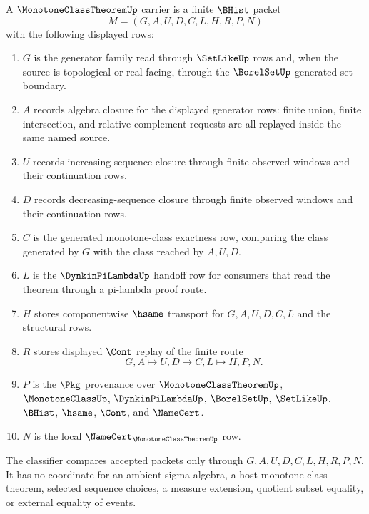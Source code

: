 \begin{definition}
\label{def:monotone-class-theorem-carrier}
A $\MonotoneClassTheoremUp$ carrier is a finite $\BHist$ packet
$$
M=(G,A,U,D,C,L,H,R,P,N)
$$
with the following displayed rows:
\begin{enumerate}
\item $G$ is the generator family read through $\SetLikeUp$ rows and, when the source is topological or real-facing, through the $\BorelSetUp$ generated-set boundary.
\item $A$ records algebra closure for the displayed generator rows: finite union, finite intersection, and relative complement requests are all replayed inside the same named source.
\item $U$ records increasing-sequence closure through finite observed windows and their continuation rows.
\item $D$ records decreasing-sequence closure through finite observed windows and their continuation rows.
\item $C$ is the generated monotone-class exactness row, comparing the class generated by $G$ with the class reached by $A,U,D$.
\item $L$ is the $\DynkinPiLambdaUp$ handoff row for consumers that read the theorem through a pi-lambda proof route.
\item $H$ stores componentwise $\hsame$ transport for $G,A,U,D,C,L$ and the structural rows.
\item $R$ stores displayed $\Cont$ replay of the finite route
$$
G,A \longmapsto U,D \longmapsto C,L \longmapsto H,P,N .
$$
\item $P$ is the $\Pkg$ provenance over $\MonotoneClassTheoremUp$, $\MonotoneClassUp$, $\DynkinPiLambdaUp$, $\BorelSetUp$, $\SetLikeUp$, $\BHist$, $\hsame$, $\Cont$, and $\NameCert$.
\item $N$ is the local $\NameCert_{\MonotoneClassTheoremUp}$ row.
\end{enumerate}
The classifier compares accepted packets only through $G,A,U,D,C,L,H,R,P,N$. It has no coordinate for an ambient sigma-algebra, a host monotone-class theorem, selected sequence choices, a measure extension, quotient subset equality, or external equality of events.
\end{definition}

